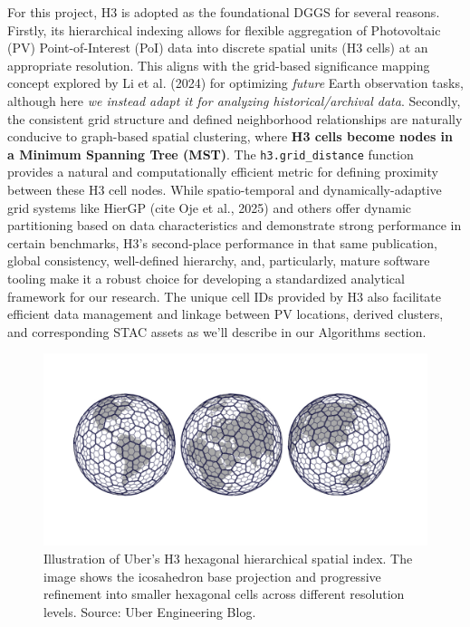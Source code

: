 \begin{multicols}{2}
For this project, H3 is adopted as the foundational DGGS for several reasons. Firstly, its hierarchical indexing allows for flexible aggregation of Photovoltaic (PV) Point-of-Interest (PoI) data into discrete spatial units (H3 cells) at an appropriate resolution. 
This aligns with the grid-based significance mapping concept explored by Li et al. (2024) for optimizing \textit{future} Earth observation tasks\cite{Li_H3_EO_planning_2024}, although here \textit{we instead adapt it for analyzing historical/archival data}. 
Secondly, the consistent grid structure and defined neighborhood relationships are naturally conducive to graph-based spatial clustering, where \textbf{H3 cells become nodes in a Minimum Spanning Tree (MST)}. 
The \texttt{h3.grid\_distance} function provides a natural and computationally efficient metric for defining proximity between these H3 cell nodes. 
While spatio-temporal and dynamically-adaptive grid systems like HierGP (cite Oje et al., 2025) \cite{Oje_HierGP_ST_2025} and others offer dynamic partitioning based on data characteristics and demonstrate strong performance in certain benchmarks, H3's 
second-place performance in that same publication, global consistency, well-defined hierarchy, and, particularly, mature software tooling make it a robust choice for developing a standardized analytical framework for our research. 
The unique cell IDs provided by H3 also facilitate efficient data management and linkage between PV locations, derived clusters, and corresponding STAC assets as we'll describe in our Algorithms section.

\end{multicols}

\begin{figure}[h!htbp]
    \centering
    \includegraphics[width=\textwidth]{./report/assets/figures/Uber-H3-globe.png} %
    \caption{Illustration of Uber's H3 hexagonal hierarchical spatial index. The image shows the icosahedron base projection and progressive refinement into smaller hexagonal cells across different resolution levels. Source: Uber Engineering Blog.}
    \label{fig:h3_illustration}
\end{figure}

